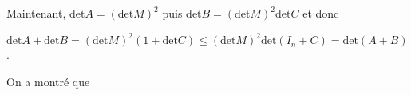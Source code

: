 {{Maintenant, $\text{det}A = (\text{det}M)^2$ puis $\text{det}B=(\text{det}M)^2\text{det}C$ et donc

\begin{center}
$\text{det}A +\text{det}B =(\text{det}M)^2(1+\text{det}C)\leqslant (\text{det}M)^2\text{det}(I_n+C) = \text{det}(A+B)$.
\end{center}

On a montré que

\begin{center}
\end{center}
}
}
